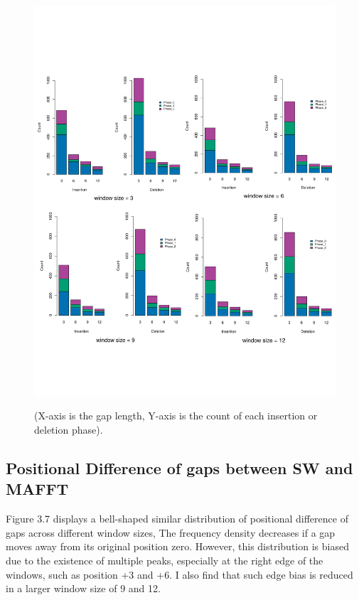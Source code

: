 \begin{figure}[H]
     \centering
     \begin{minipage}[t]{1\textwidth }
     \includegraphics[page=1,width=1\linewidth, height=1.2\linewidth]{Fig6.pdf}
     { {(X-axis is the gap length, Y-axis is the count of each insertion or deletion phase).}\par}
     \end{minipage}
\end{figure}
\newpage

\subsection{Positional Difference of gaps between SW and MAFFT}
Figure 3.7 displays a bell-shaped similar distribution of positional difference of gaps across different window sizes, The frequency density decreases if a gap moves away from its original position zero.  However, this distribution is biased due to the existence of multiple peaks, especially at the right edge of the windows, such as position +3 and +6. I also find that such edge bias is reduced in a larger window size of 9 and 12. \\   
 
